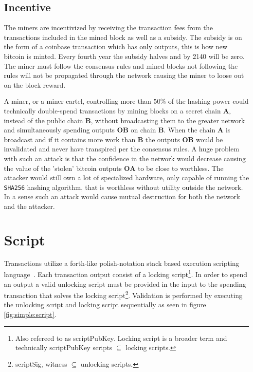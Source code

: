 \subsection{Incentive}

The miners are incentivized by receiving the transaction fees from the transactions included in the mined block as well as a subsidy. The subsidy is on the form of a coinbase transaction which has only outputs, this is how new bitcoin is minted. Every fourth year the subsidy halves and by 2140 will be zero. The miner must follow the consensus rules and mined blocks not following the rules will not be propagated through the network causing the miner to loose out on the block reward.

A \gls{miner}, or a miner cartel, controlling more than 50\% of the hashing power could technically double-spend transactions by mining blocks on a secret chain \textbf{A}, instead of the public chain \textbf{B}, without broadcasting them to the greater network and simultaneously spending outputs \textbf{OB} on chain \textbf{B}. When the chain \textbf{A} is broadcast and if it contains more work than \textbf{B} the outputs \textbf{OB} would be invalidated and never have transpired per the consensus rules. A huge problem with such an attack is that the confidence in the network would decrease causing the value of the 'stolen' bitcoin outputs \textbf{OA} to be close to worthless. The attacker would still own a lot of specialized hardware, only capable of running the \texttt{SHA256} hashing algorithm, that is worthless without utility outside the network. In a sense such an attack would cause mutual destruction for both the network and the attacker. 

\section{Script}
\label{sec:script}

Transactions utilize a forth-like polish-notation stack based execution scripting language~\cite{antonopoulos:mastering:bitcoin}. Each transaction output consist of a locking script\footnote{Also refereed to as scriptPubKey. Locking script is a broader term and technically scriptPubKey scripts $ \subseteq $ locking scripts.}. In order to spend an output a valid unlocking script must be provided in the input to the spending transaction that solves the locking script\footnote{scriptSig, witness $\subseteq $ unlocking scripts.}. Validation is performed by executing the unlocking script and locking script sequentially as seen in figure \ref{fig:simple:script}. 


